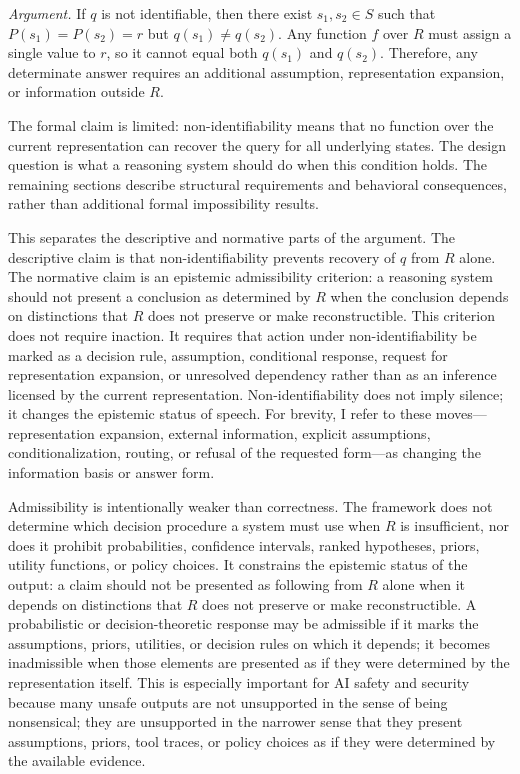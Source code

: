\documentclass[11pt]{article}
\begin{document}
\emph{Argument.}
If $q$ is not identifiable, then there exist $s_1,s_2\in S$ such that $P(s_1)=P(s_2)=r$ but $q(s_1)\neq q(s_2)$. Any function $f$ over $R$ must assign a single value to $r$, so it cannot equal both $q(s_1)$ and $q(s_2)$. Therefore, any determinate answer requires an additional assumption, representation expansion, or information outside $R$.

The formal claim is limited: non-identifiability means that no function over the current representation can recover the query for all underlying states. The design question is what a reasoning system should do when this condition holds. The remaining sections describe structural requirements and behavioral consequences, rather than additional formal impossibility results.

This separates the descriptive and normative parts of the argument. The descriptive claim is that non-identifiability prevents recovery of $q$ from $R$ alone. The normative claim is an epistemic admissibility criterion: a reasoning system should not present a conclusion as determined by $R$ when the conclusion depends on distinctions that $R$ does not preserve or make reconstructible. This criterion does not require inaction. It requires that action under non-identifiability be marked as a decision rule, assumption, conditional response, request for representation expansion, or unresolved dependency rather than as an inference licensed by the current representation. Non-identifiability does not imply silence; it changes the epistemic status of speech. For brevity, I refer to these moves---representation expansion, external information, explicit assumptions, conditionalization, routing, or refusal of the requested form---as changing the information basis or answer form.

Admissibility is intentionally weaker than correctness. The framework does not determine which decision procedure a system must use when $R$ is insufficient, nor does it prohibit probabilities, confidence intervals, ranked hypotheses, priors, utility functions, or policy choices. It constrains the epistemic status of the output: a claim should not be presented as following from $R$ alone when it depends on distinctions that $R$ does not preserve or make reconstructible. A probabilistic or decision-theoretic response may be admissible if it marks the assumptions, priors, utilities, or decision rules on which it depends; it becomes inadmissible when those elements are presented as if they were determined by the representation itself. This is especially important for AI safety and security because many unsafe outputs are not unsupported in the sense of being nonsensical; they are unsupported in the narrower sense that they present assumptions, priors, tool traces, or policy choices as if they were determined by the available evidence.
\end{document}

